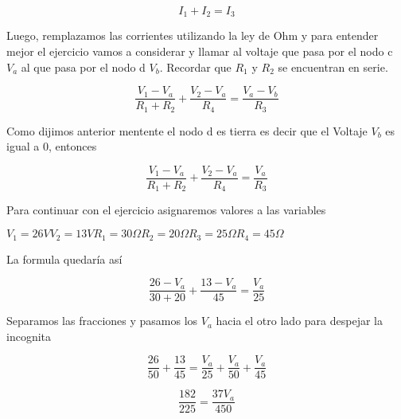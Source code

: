 \begin{example}
        \begin{equation*}
        I_1 + I_2 = I_3
        \end{equation*}

        Luego, remplazamos las corrientes utilizando la ley de Ohm y para entender mejor el ejercicio vamos a considerar y llamar al voltaje que pasa por el nodo c $V_a$ al que pasa por el nodo d $V_b$. Recordar que $R_1$ y $R_2$ se encuentran en serie.

        \begin{equation*}
        \frac{V_1 - V_a}{R_1+R_2} + \frac{V_2 - V_a}{R_4}= \frac{V_a - V_b}{R_3}
        \end{equation*}

        Como dijimos anterior mentente el nodo d es tierra es decir que el Voltaje $V_b$ es igual a 0, entonces

        \begin{equation*}
        \frac{V_1 - V_a}{R_1+R_2} + \frac{V_2 - V_a}{R_4}= \frac{V_a }{R_3}
        \end{equation*}

        Para continuar con el ejercicio asignaremos valores a las variables

        \hspace{1 cm}$V_1=26 V$\hspace{1 cm}$V_2=13 V$\hspace{1 cm}$R_1=30\Omega$\hspace{1 cm}$R_2=20 \Omega$\hspace{1 cm}$R_3=25 \Omega$\hspace{1 cm}$R_4=45 \Omega$

        La formula quedaría así

        \begin{equation*}
        \frac{26 - V_a}{30+20} + \frac{13 - V_a}{45}= \frac{V_a }{25}
        \end{equation*}

        Separamos las fracciones y pasamos los $V_a$ hacia el otro lado para despejar la incognita

        \begin{equation*}
        \frac{26 }{50} + \frac{13 }{45}= \frac{V_a }{25} + \frac{V_a }{50} + \frac{V_a }{45}
        \end{equation*}

        \begin{equation*}
        \frac{182}{225} = \frac{37V_a}{450}
        \end{equation*}


\end{example}
